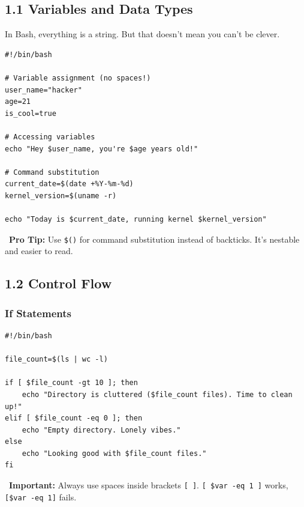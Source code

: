 \documentclass[12pt]{article}
\newcommand{\warningicon}{\faExclamationTriangle}
\newcommand{\tipsicon}{\faLightbulb}
\begin{document}
\subsection*{1.1 Variables and Data Types}

In Bash, everything is a string. But that doesn't mean you can't be clever.

\begin{highlightbox}
\begin{verbatim}
#!/bin/bash

# Variable assignment (no spaces!)
user_name="hacker"
age=21
is_cool=true

# Accessing variables
echo "Hey $user_name, you're $age years old!"

# Command substitution
current_date=$(date +%Y-%m-%d)
kernel_version=$(uname -r)

echo "Today is $current_date, running kernel $kernel_version"
\end{verbatim}
\end{highlightbox}

\begin{infobox}
\tipsicon\ \textbf{Pro Tip:} Use \texttt{\$()} for command substitution instead of backticks. It's nestable and easier to read.
\end{infobox}

\subsection*{1.2 Control Flow}

\subsubsection*{If Statements}

\begin{highlightbox}
\begin{verbatim}
#!/bin/bash

file_count=$(ls | wc -l)

if [ $file_count -gt 10 ]; then
    echo "Directory is cluttered ($file_count files). Time to clean up!"
elif [ $file_count -eq 0 ]; then
    echo "Empty directory. Lonely vibes."
else
    echo "Looking good with $file_count files."
fi
\end{verbatim}
\end{highlightbox}

\begin{infobox}
\warningicon\ \textbf{Important:} Always use spaces inside brackets \texttt{[ ]}. \texttt{[ \$var -eq 1 ]} works, \texttt{[\$var -eq 1]} fails.
\end{infobox}
\end{document}
